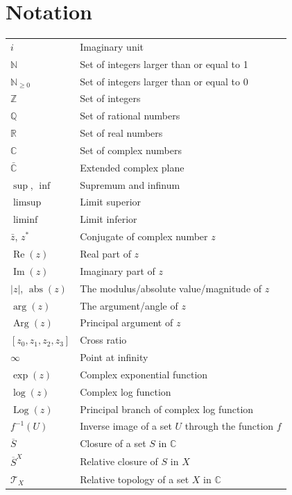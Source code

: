 \documentclass[11pt]{report}
\theoremstyle{definition}
\theoremstyle{remark}
\numberwithin{equation}{section}
\DeclareMathOperator{\real}{\mathrm{Re}}
\DeclareMathOperator{\imag}{\mathrm{Im}}
\DeclareMathOperator{\abs}{\mathrm{abs}}
\DeclareMathOperator{\Arg}{\mathrm{Arg}}
\DeclareMathOperator{\Log}{\mathrm{Log}}
\begin{document}
\newpage


\section{Notation}



\begin{longtable}{ll}
 $i$ & Imaginary unit \\
 $\mathbb{N}$ &Set of integers larger than or equal to 1 \\
 $\mathbb{N}_{\geq 0}$& Set of integers larger than or equal to 0\\
 $\mathbb{Z}$ & Set of integers \\
 $\mathbb{Q}$ & Set of rational numbers \\
 $\mathbb{R}$ & Set of real numbers \\
 $\mathbb{C}$ & Set of complex numbers \\
 $\bar{\mathbb{C}}$ & Extended complex plane \\
 $\sup$, $\inf$ & Supremum and infinum \\
 $\limsup$ & Limit superior \\
 $\liminf$ & Limit inferior \\
 $\bar{z}$, $z^*$ & Conjugate of complex number $z$ \\
 $\real(z)$ & Real part of $z$ \\
 $\imag(z)$ & Imaginary part of $z$ \\
 $|z|$, $\abs(z)$ & The modulus/absolute value/magnitude of $z$ \\
 $\arg(z)$ & The argument/angle of $z$ \\
 $\Arg (z)$ & Principal argument of $z$ \\
 $[z_0,z_1,z_2,z_3]$ & Cross ratio \\
 $\infty$ &  Point at infinity \\
 $\exp(z)$ & Complex exponential function \\
 $\log(z)$ & Complex log function \\
 $\Log(z)$ & Principal branch of complex log function \\
 $f^{-1}(U)$ & Inverse image of a set $U$ through the function $f$\\
 $\overline{S}$ & Closure of a set $S$ in $\mathbb{C}$ \\
 $\overline{S}^X$ & Relative closure of $S$ in $X$ \\
 $\mathcal{T}_X$ & Relative topology of a set $X$ in $\mathbb{C}$ \\

\end{longtable}
\end{document}
